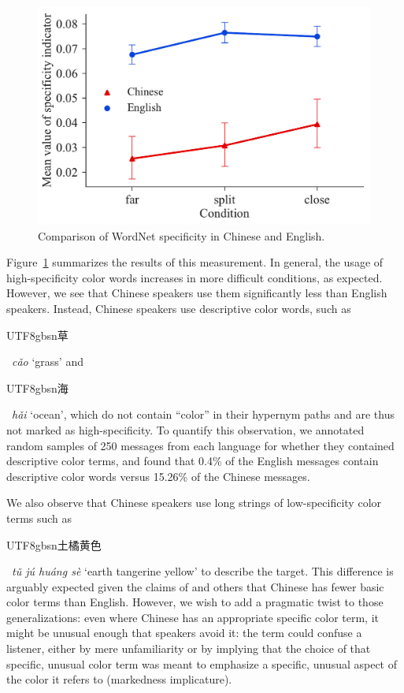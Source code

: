 \documentclass[11pt,a4paper]{article}
\newenvironment{zh}{\begin{CJK}{UTF8}{gbsn}}{\end{CJK}}
\newcommand{\textzh}[2]{\begin{zh}#1\end{zh}~\emph{#2}}
\renewcommand{\|}{\mid}
\newcommand{\Figref}[1]{Figure~\ref{#1}}
\begin{document}
\begin{figure}[!t]
    \centering
    \includegraphics[width=0.8\columnwidth]{specificity.pdf}
    \caption{Comparison of WordNet specificity in Chinese and English.}
    \label{fig:specificity}
\end{figure}

\Figref{fig:specificity} summarizes the results of this measurement. In general, the usage of high-specificity color words increases in more difficult conditions, as expected. However, we see that Chinese speakers use them significantly less than English speakers. Instead, Chinese speakers use descriptive color words, such as \textzh{草}{c\v{a}o} `grass' and \textzh{海}{h\v{a}i} `ocean', which do not contain ``color'' in their hypernym paths and are thus not marked as high-specificity. 
To quantify this observation, we annotated random samples of 250 messages from each language for whether they contained descriptive color terms, and found that 0.4\% of the English messages contain descriptive color words versus 15.26\% of the Chinese messages.

We also observe that Chinese speakers use long strings of low-specificity color terms such as \textzh{土橘黄色}{t\v{u} j\'{u} hu\'{a}ng s\`{e}} `earth tangerine yellow' to describe the target. This difference is arguably expected given the claims of \citet{BerlinKay1969} and others that Chinese has fewer basic color terms than English. However, we wish to add a pragmatic twist to those generalizations: even where Chinese has an appropriate specific color term, it might be unusual enough that speakers avoid it: the term could confuse a listener, either by mere unfamiliarity or by implying that the choice of that specific, unusual color term was meant to emphasize a specific, unusual aspect of the color it refers to (markedness implicature).

\end{document}
